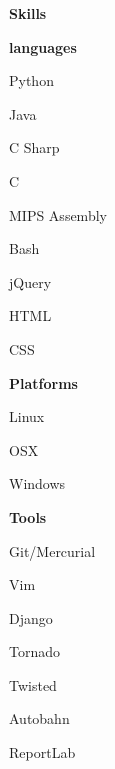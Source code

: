 \documentclass[a4paper,12pt,final]{memoir}
\newcommand{\SmallSep}{\vspace{0.5em}}
\newcommand{\CVSection}[1]
	{\Large\textbf{ #1}\par
	\SmallSep\normalsize\normalfont}
\newcommand{\CVItem}[1]
	{\textbf{\color{RoyalBlue} #1}}
\begin{document}
\CVSection{Skills}


\CVItem{ languages }
\begin{multicols}{3}
\begin{compactitem}[\color{RoyalBlue}$\circ$]

    
	\item Python
	
	\item Java
	
	\item C Sharp
	
	\item C
	
	\item MIPS Assembly
	
	\item Bash
	
	\item jQuery
	
	\item HTML
	
	\item CSS
	
\end{compactitem}
\end{multicols}
\SmallSep



\CVItem{ Platforms }
\begin{multicols}{3}
\begin{compactitem}[\color{RoyalBlue}$\circ$]

    
	\item Linux
	
	\item OSX
	
	\item  Windows
	
\end{compactitem}
\end{multicols}
\SmallSep



\CVItem{ Tools }
\begin{multicols}{3}
\begin{compactitem}[\color{RoyalBlue}$\circ$]

    
	\item Git/Mercurial
	
	\item Vim
	
	\item Django
	
	\item Tornado
	
	\item Twisted
	
	\item Autobahn
	
	\item ReportLab
	
\end{compactitem}
\end{multicols}
\SmallSep
\end{document}
